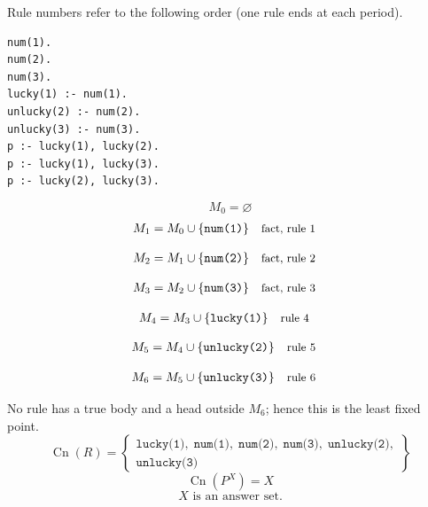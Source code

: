 \documentclass[a4paper,11pt]{article}
\newif\ifexplain
\newcommand{\explain}[1]{\ifexplain\begin{erklbox}#1\end{erklbox}\fi}
\newcommand{\why}[1]{\text{\small #1}}
\newcommand{\at}[1]{\texttt{#1}}
\begin{document}
Rule numbers refer to the following order (one rule ends at each period).
\begin{small}
\begin{verbatim}
num(1).
num(2).
num(3).
lucky(1) :- num(1).
unlucky(2) :- num(2).
unlucky(3) :- num(3).
p :- lucky(1), lucky(2).
p :- lucky(1), lucky(3).
p :- lucky(2), lucky(3).
\end{verbatim}
\end{small}
\explain{Beim Redukt bleibt die Kandidatenmenge fest. Wir entscheiden zuerst, welche Regeln wegfallen. Erst danach berechnen wir aus den verbleibenden positiven Regeln die kleinste abgeschlossene Menge. Ein Modell allein reicht nicht: Diese Menge muss genau der Kandidat sein.}
\[
M_0=\varnothing
\]
\begin{align*}
M_{1} &= M_{0}\cup \{\at{num(1)}\} && \why{fact, rule 1}
\end{align*}
\explain{Diese Regel hat keinen Körper. Ihr Kopf $\at{num(1)}$ ist damit ein Fakt und muss in die Menge.}
\begin{align*}
M_{2} &= M_{1}\cup \{\at{num(2)}\} && \why{fact, rule 2}
\end{align*}
\explain{Diese Regel hat keinen Körper. Ihr Kopf $\at{num(2)}$ ist damit ein Fakt und muss in die Menge.}
\begin{align*}
M_{3} &= M_{2}\cup \{\at{num(3)}\} && \why{fact, rule 3}
\end{align*}
\explain{Diese Regel hat keinen Körper. Ihr Kopf $\at{num(3)}$ ist damit ein Fakt und muss in die Menge.}
\begin{align*}
M_{4} &= M_{3}\cup \{\at{lucky(1)}\} && \why{rule 4}
\end{align*}
\explain{Für $\at{lucky(1)}$ brauchen wir $\at{num(1)}$. Weil diese Voraussetzungen bereits hergeleitet sind, dürfen wir den Regelkopf jetzt aufnehmen und alle bisherigen Atome behalten; bei einer fehlenden Voraussetzung würde diese Regel dagegen noch nichts beitragen.}
\begin{align*}
M_{5} &= M_{4}\cup \{\at{unlucky(2)}\} && \why{rule 5}
\end{align*}
\explain{Für $\at{unlucky(2)}$ brauchen wir $\at{num(2)}$. Weil diese Voraussetzungen bereits hergeleitet sind, dürfen wir den Regelkopf jetzt aufnehmen und alle bisherigen Atome behalten; bei einer fehlenden Voraussetzung würde diese Regel dagegen noch nichts beitragen.}
\begin{align*}
M_{6} &= M_{5}\cup \{\at{unlucky(3)}\} && \why{rule 6}
\end{align*}
\explain{Für $\at{unlucky(3)}$ brauchen wir $\at{num(3)}$. Weil diese Voraussetzungen bereits hergeleitet sind, dürfen wir den Regelkopf jetzt aufnehmen und alle bisherigen Atome behalten; bei einer fehlenden Voraussetzung würde diese Regel dagegen noch nichts beitragen.}
No rule has a true body and a head outside $M_{6}$; hence this is the least fixed point.
\[
\operatorname{Cn}(R)=\left\{\begin{gathered}\at{lucky(1)},\;\at{num(1)},\;\at{num(2)},\;\at{num(3)},\;\at{unlucky(2)},\\\at{unlucky(3)}\end{gathered}\right\}
\]
\[
\operatorname{Cn}(P^X)=X
\]
\[
\boxed{X\text{ is an answer set.}}
\]
\end{document}
